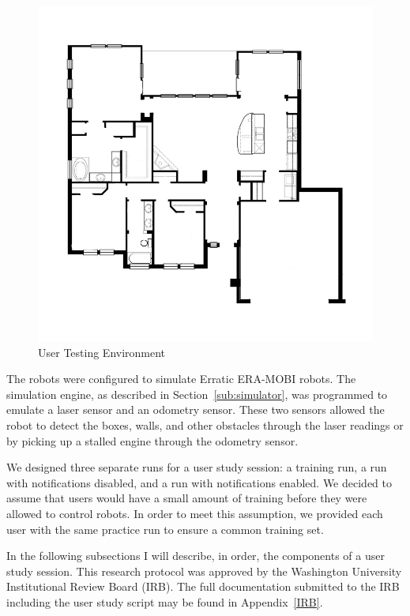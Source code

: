 \begin{figure}[ht]
\begin{center}
\includegraphics[width=5in]{images/generic-house.png}
\caption{User Testing Environment\label{fig:test-environment}}
\end{center}
\end{figure}

The robots were configured to simulate Erratic ERA-MOBI robots. The simulation engine, as described in Section~\ref{sub:simulator}, was programmed to emulate a laser sensor and an odometry sensor. These two sensors allowed the robot to detect the boxes, walls, and other obstacles through the laser readings or by picking up a stalled engine through the odometry sensor.

We designed three separate runs for a user study session: a training run, a run with notifications disabled, and a run with notifications enabled. We decided to assume that users would have a small amount of training before they were allowed to control robots. In order to meet this assumption, we provided each user with the same practice run to ensure a common training set.

In the following subsections I will describe, in order, the components of a user study session. This research protocol was approved by the Washington University Institutional Review Board (IRB). The full documentation submitted to the IRB including the user study script may be found in Appendix~\ref{IRB}.

